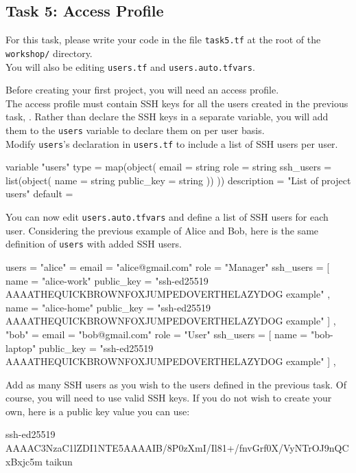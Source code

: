\subsection{Task 5: Access Profile}\label{sec:task5}

\begin{note}
For this task, please write your code in the file \texttt{task5.tf}
at the root of the \texttt{workshop/} directory.\\
You will also be editing \texttt{users.tf} and \texttt{users.auto.tfvars}.
\end{note}

Before creating your first project, you will need an access profile.\\

The access profile must contain SSH keys for all the users created in the previous task, .
Rather than declare the SSH keys in a separate variable, you will add them to the \texttt{users} variable to
declare them on per user basis.\\

Modify \texttt{users}'s declaration in \texttt{users.tf} to include a list of SSH users per user.
\begin{tf}
variable "users" {
  type = map(object({
    email = string
    role  = string
    ssh_users = list(object({
      name       = string
      public_key = string
    }))
  }))
  description = "List of project users"
  default     = {}
}
\end{tf}

You can now edit \texttt{users.auto.tfvars} and define a list of SSH users for each user.
Considering the previous example of Alice and Bob, here is the same definition of \texttt{users}
with added SSH users.
\begin{tf}
users = {
  "alice" = {
    email = "alice@gmail.com"
    role  = "Manager"
    ssh_users = [
      {
        name       = "alice-work"
        public_key = "ssh-ed25519 AAAATHEQUICKBROWNFOXJUMPEDOVERTHELAZYDOG example"
      },
      {
        name       = "alice-home"
        public_key = "ssh-ed25519 AAAATHEQUICKBROWNFOXJUMPEDOVERTHELAZYDOG example"
      }
    ]
  },
  "bob" = {
    email = "bob@gmail.com"
    role  = "User"
    ssh_users = [
      {
        name       = "bob-laptop"
        public_key = "ssh-ed25519 AAAATHEQUICKBROWNFOXJUMPEDOVERTHELAZYDOG example"
      }
    ]
  },
}
\end{tf}
Add as many SSH users as you wish to the users defined in the previous task.
Of course, you will need to use valid SSH keys. If you do not wish to create your own,
here is a public key value you can use:
\begin{raw}
ssh-ed25519 AAAAC3NzaC1lZDI1NTE5AAAAIB/8P0zXmI/Il81+/fnvGrf0X/VyNTrOJ9nQCxBxjc5m taikun
\end{raw}

